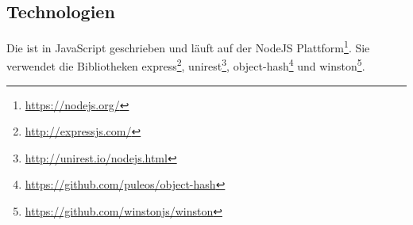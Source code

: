 \subsection{Technologien}
    Die {\classificationStorageAPI} ist in JavaScript geschrieben und läuft auf der
    NodeJS Plattform\footnote{\url{https://nodejs.org/}}.
    Sie verwendet die Bibliotheken
    express\footnote{\url{http://expressjs.com/}},
    unirest\footnote{\url{http://unirest.io/nodejs.html}},
    object-hash\footnote{\url{https://github.com/puleos/object-hash}}
    und winston\footnote{\url{https://github.com/winstonjs/winston}}.